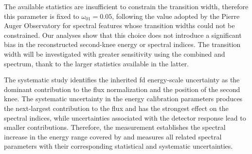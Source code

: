 \documentclass[main.tex]{subfiles}
\begin{document}
The available  statistics are insufficient to constrain the transition width, therefore this parameter is fixed to $\omega_{01}=0.05$, following the value adopted by the Pierre Auger Observatory for spectral features whose transition widths could not be constrained.
Our analyses show that this choice does not introduce a significant bias in the reconstructed second-knee energy or spectral indices.
The transition width will be investigated with greater sensitivity using the combined  and  spectrum, thank to the larger statistics available in the latter.

The systematic study identifies the inherited \gls{fd} energy-scale uncertainty as the dominant contribution to the flux normalization and the position of the second knee.
The systematic uncertainty in the  energy calibration parameters produces the next-largest contribution to the flux and has the strongest effect on the spectral indices, while uncertainties associated with the detector response lead to smaller contributions.
Therefore, the measurement establishes the spectral increase in the energy range covered by  and measures all related spectral parameters with their corresponding statistical and systematic uncertainties.
\end{document}
